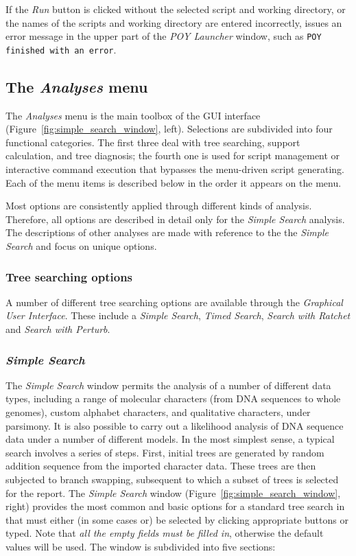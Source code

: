 If the \emph{Run} button is clicked without the selected script and
working directory, or the names of the scripts and working directory are entered incorrectly, \poy issues an
error message in the upper part of the \emph{POY Launcher} window,
such as \texttt{POY finished with an error}.

\subsection{The \emph{Analyses} menu}
The \emph{Analyses} menu is the main toolbox of the \poy GUI interface (Figure~\ref{fig:simple_search_window}, left). Selections are subdivided into four functional categories. The first three deal with tree searching, support calculation, and tree diagnosis; the fourth one is used for  script management or interactive command execution that bypasses the menu-driven script generating. Each of the menu items is described below in the order it appears on the menu.

Most options are consistently applied through different kinds of analysis. Therefore, all options are described in detail only for the \emph{Simple Search} analysis. The descriptions of other analyses are made with reference to the the \emph{Simple Search} and focus on unique options.


\subsubsection{Tree searching options}

A number of different tree searching options are available through the \emph{Graphical User Interface}.  These include a \emph{Simple Search}, \emph{Timed Search}, \emph{Search with Ratchet} and \emph{Search with Perturb}.

\subsubsection*{\emph{Simple Search}}
The \emph{Simple Search} window permits the analysis of a number of different data types, including a range of molecular characters (from DNA sequences to whole genomes), custom alphabet characters, and qualitative characters, under parsimony.  It is also possible to carry out a likelihood analysis of DNA sequence data under a number of different models.  
In the most simplest sense, a typical search involves a series of steps. First, initial trees are generated by random addition sequence from the imported character data. These trees are then subjected to branch swapping, subsequent to which a subset of trees is selected for the report.
The \emph{Simple Search} window (Figure~\ref{fig:simple_search_window}, right) provides the most common and basic options for a standard tree search in \poy that must either (in some cases or) be selected by clicking appropriate buttons or typed. Note that \emph{all the empty fields must be filled in}, otherwise the default values will be used. The window is subdivided into five sections: 

